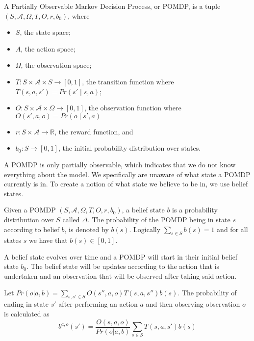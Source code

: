 \begin{definition}
	A Partially Observable Markov Decision Process, or POMDP, is a tuple $(S, \mathcal{A}, \Omega, T, O, r, b_0)$, where
	\begin{itemize}
		\item $S$, the state space;
		\item $A$, the action space;
		\item $\Omega$, the observation space;
		\item $T:S\times \mathcal{A} \times S \to [0,1]$, the transition function where
			$T(s,a,s')=Pr(s'\mid s,a)$;
		\item $O:S\times \mathcal{A} \times \Omega \to [0,1]$, the observation function where
		$O(s',a,o)= Pr(o\mid s',a)$
		\item $r: S \times \mathcal{A} \to \mathds{R}$, the reward function, and 
		\item $b_0 : S \to [0,1]$, the initial probability distribution over states.
	\end{itemize}
\end{definition}

A POMDP is only partially observable, which indicates that we do not know everything about the model. We specifically are unaware of what state a POMDP currently is in. To create a notion of what state we believe to be in, we use belief states.

\begin{definition}
	Given a POMDP $(S, \mathcal{A}, \Omega, T, O, r, b_0)$, a belief state $b$ is a probability distribution over $S$ called $\Delta$. The probability of the POMDP being in state $s$ according to belief $b$, is denoted by $b(s)$. Logically $\sum_{s\in S}b(s)=1$ and for all states $s$ we have that $b(s)\in[0,1]$.
\end{definition}

A belief state evolves over time and a POMDP will start in their initial belief state $b_0$.
The belief state will be updates according to the action that is undertaken and an observation that will be observed after taking said action.

\begin{definition}
Let $Pr(o|a,b)=\sum_{s,s'\in S}O(s'',a,o)T(s,a,s'')b(s)$. The probability of ending in state $s'$ after performing an action $a$ and then observing observation $o$ is calculated as
\begin{equation}
	b^{a,o}(s')=\frac{O(s,a,o)}{Pr(o | a,b)}\sum_{s\in S} T(s,a,s')b(s)
\end{equation}
\end{definition}

